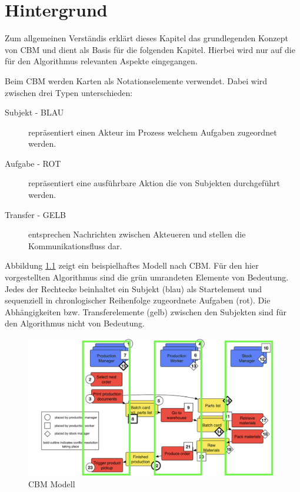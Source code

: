 \chapter{Hintergrund} %
\label{cha:hintergrund}
Zum allgemeinen Verständis erklärt dieses Kapitel das grundlegenden Konzept von CBM und dient als Basis für die folgenden Kapitel. Hierbei wird nur auf die für den Algorithmus relevanten Aspekte eingegangen. 

Beim CBM werden Karten als Notationselemente verwendet. Dabei wird zwischen drei Typen unterschieden:
\begin{description}
	\item[Subjekt - BLAU] repräsentiert einen Akteur im Prozess welchem Aufgaben zugeordnet werden.
	\item[Aufgabe - ROT] repräsentiert eine ausführbare Aktion die von Subjekten durchgeführt werden.
	\item[Transfer - GELB] entsprechen Nachrichten zwischen Akteueren und stellen die Kommunikationsfluss dar.
\end{description}

Abbildung \ref{fig:cbm-grundstruktur} zeigt ein beispielhaftes Modell nach CBM. Für den hier vorgestellten Algorithmus sind die grün umrandeten Elemente von Bedeutung. Jedes der Rechtecke beinhaltet ein Subjekt (blau) als Startelement und sequenziell in chronlogischer Reihenfolge zugeordnete Aufgaben (rot). Die Abhängigkeiten bzw. Transferelemente (gelb) zwischen den Subjekten sind für den Algorithmus nicht von Bedeutung.
\begin{figure}[h]
	\centering 
	\begin{minipage}[b]{0.75\textwidth} 
		\includegraphics[width=\textwidth]{figures/cbm-grundstruktur.png} 		\caption{CBM Modell 
		\protect~\cite{oppl2016linking}} 
		\label{fig:cbm-grundstruktur} 
	\end{minipage}
\end{figure}
